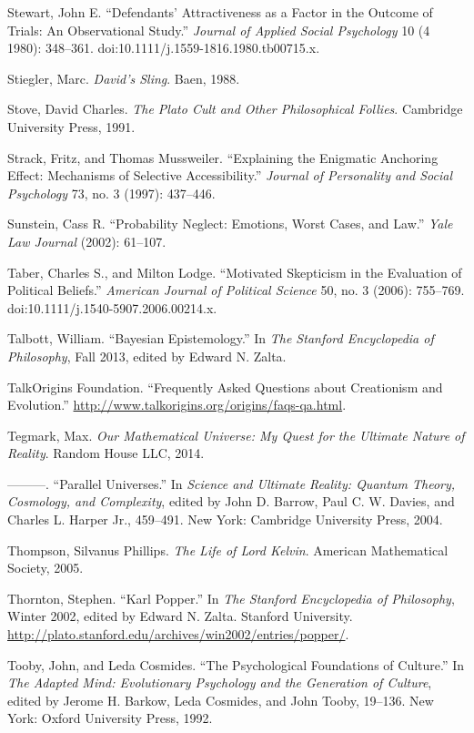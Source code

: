 {
 Stewart, John E. ``Defendants'
Attractiveness as a Factor in the Outcome of Trials: An Observational
Study.'' \textit{Journal of Applied Social
Psychology} 10 (4 1980): 348--361.
doi:10.1111/j.1559-1816.1980.tb00715.x.}

{
 Stiegler, Marc. \textit{David's Sling}. Baen,
1988.}

{
 Stove, David Charles. \textit{The Plato Cult and Other
Philosophical Follies}. Cambridge University Press, 1991.}

{
 Strack, Fritz, and Thomas Mussweiler.
``Explaining the Enigmatic Anchoring Effect:
Mechanisms of Selective Accessibility.''
\textit{Journal of Personality and Social Psychology} 73, no. 3 (1997):
437--446.}

{
 Sunstein, Cass R. ``Probability Neglect:
Emotions, Worst Cases, and Law.'' \textit{Yale Law
Journal} (2002): 61--107.}

{
 Taber, Charles S., and Milton Lodge. ``Motivated
Skepticism in the Evaluation of Political Beliefs.''
\textit{American Journal of Political Science} 50, no. 3 (2006):
755--769. doi:10.1111/j.1540-5907.2006.00214.x.}

{
 Talbott, William. ``Bayesian
Epistemology.'' In \textit{The Stanford Encyclopedia
of Philosophy}, Fall 2013, edited by Edward N. Zalta.}

{
 TalkOrigins Foundation. ``Frequently Asked
Questions about Creationism and Evolution.''
\url{http://www.talkorigins.org/origins/faqs-qa.html}.}

{
 Tegmark, Max. \textit{Our Mathematical Universe: My Quest for the
Ultimate Nature of Reality}. Random House LLC, 2014.}

{
 {}---{}---{}---. ``Parallel
Universes.'' In \textit{Science and Ultimate Reality:
Quantum Theory, Cosmology, and Complexity}, edited by John D. Barrow,
Paul C. W. Davies, and Charles L. Harper Jr., 459--491. New York:
Cambridge University Press, 2004.}

{
 Thompson, Silvanus Phillips. \textit{The Life of Lord Kelvin}.
American Mathematical Society, 2005.}

{
 Thornton, Stephen. ``Karl
Popper.'' In \textit{The Stanford Encyclopedia of
Philosophy}, Winter 2002, edited by Edward N. Zalta. Stanford
University.
\url{http://plato.stanford.edu/archives/win2002/entries/popper/}.}

{
 Tooby, John, and Leda Cosmides. ``The
Psychological Foundations of Culture.'' In
\textit{The Adapted Mind: Evolutionary Psychology and the Generation of
Culture}, edited by Jerome H. Barkow, Leda Cosmides, and John Tooby,
19--136. New York: Oxford University Press, 1992.}

